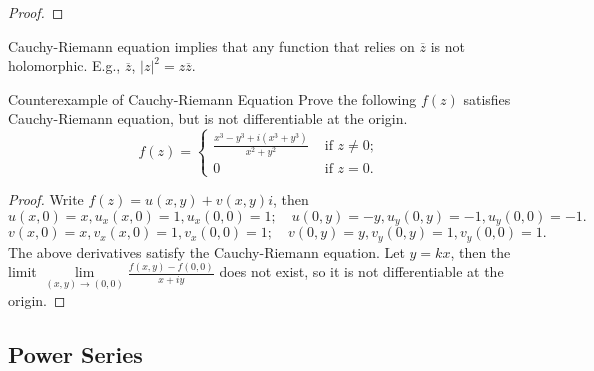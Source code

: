 \begin{proof}
  
\end{proof}

\begin{note}
  Cauchy-Riemann equation implies that any function that relies on
  $\overline{z}$ is not holomorphic.
  E.g., $\overline{z}$, $|z|^2 = z\overline{z}$.
\end{note}

\begin{example}{Counterexample of Cauchy-Riemann Equation}{}
  Prove the following $f(z)$ satisfies Cauchy-Riemann equation,
  but is not differentiable at the origin.
  \begin{equation}
    f(z) =
    \begin{cases}
      \frac{x^3 - y^3 + i(x^3 + y^3)}{x^2 + y^2} & \text{ if } z \neq 0;\\
      0 & \text{ if } z = 0.
    \end{cases}
  \end{equation}
\end{example}

\begin{proof}
  Write $f(z) = u(x,y) + v(x,y)i$, then
  \begin{equation}
    u(x, 0) = x, u_x(x, 0) = 1, u_x(0, 0) = 1; \quad
    u(0, y) = -y, u_y(0, y) = -1, u_y(0, 0) = -1.
  \end{equation}
  \begin{equation}
    v(x,0) = x, v_x(x,0) = 1, v_x(0,0) = 1; \quad
    v(0,y) = y, v_y(0, y) = 1, v_y(0, 0) = 1.
  \end{equation}
  The above derivatives satisfy the Cauchy-Riemann equation.
  Let $y = kx$, then the limit $\lim \limits _{(x,y) \rightarrow (0,0)}\frac{f(x,y) - f(0, 0)}{x+iy}$
  does not exist, so it is not differentiable at the origin.
\end{proof}

\subsection{Power Series}



